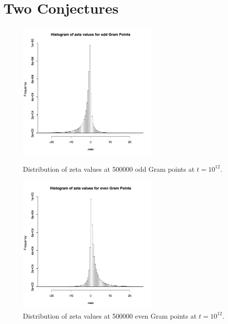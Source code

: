 \documentclass[twoside]{article}
\begin{document}
\section{\label{sec7}Two Conjectures}

\begin{figure}
\centering
\includegraphics[width=0.62\textwidth]{ozeta.jpg}
\caption[]{ 
  Distribution of zeta values at 500000 odd Gram points  at $t = 10^{12}$.
 }
\vspace{1mm}
\label{oddhist}

\includegraphics[width=0.62\textwidth]{ezeta.jpg}
\caption[]{ 
   Distribution of zeta values at 500000 even Gram points  at $t = 10^{12}$.
 }
\label{evenhist}
\vspace{1mm}
\end{figure}
\end{document}
